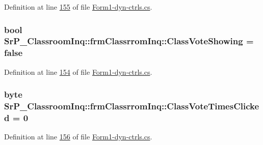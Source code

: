 \-Definition at line \hyperlink{_form1-dyn-ctrls_8cs_source_l00155}{155} of file \hyperlink{_form1-dyn-ctrls_8cs_source}{\-Form1-\/dyn-\/ctrls.\-cs}.

\hypertarget{class_sr_p___classroom_inq_1_1frm_classrrom_inq_ae23aa3324c19688aa8d35b0217cf9605}{
\subsubsection[{\-Class\-Vote\-Showing}]{\setlength{\rightskip}{0pt plus 5cm}bool {\bf \-Sr\-P\-\_\-\-Classroom\-Inq\-::frm\-Classrrom\-Inq\-::\-Class\-Vote\-Showing} = false}}
\label{class_sr_p___classroom_inq_1_1frm_classrrom_inq_ae23aa3324c19688aa8d35b0217cf9605}


\-Definition at line \hyperlink{_form1-dyn-ctrls_8cs_source_l00154}{154} of file \hyperlink{_form1-dyn-ctrls_8cs_source}{\-Form1-\/dyn-\/ctrls.\-cs}.

\hypertarget{class_sr_p___classroom_inq_1_1frm_classrrom_inq_ab63c943c019363dba6aa86686b9f2bf6}{
\subsubsection[{\-Class\-Vote\-Times\-Clicked}]{\setlength{\rightskip}{0pt plus 5cm}byte {\bf \-Sr\-P\-\_\-\-Classroom\-Inq\-::frm\-Classrrom\-Inq\-::\-Class\-Vote\-Times\-Clicked} = 0}}
\label{class_sr_p___classroom_inq_1_1frm_classrrom_inq_ab63c943c019363dba6aa86686b9f2bf6}


\-Definition at line \hyperlink{_form1-dyn-ctrls_8cs_source_l00156}{156} of file \hyperlink{_form1-dyn-ctrls_8cs_source}{\-Form1-\/dyn-\/ctrls.\-cs}.

